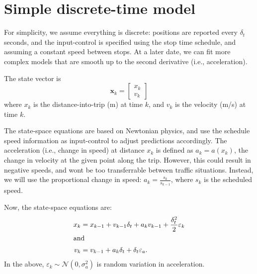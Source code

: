 \documentclass[11pt]{article}\usepackage[]{graphicx}\usepackage[]{color}
\begin{document}
\section{Simple discrete-time model}

For simplicity, we assume everything is discrete: positions are reported every $\delta_t$
seconds, and the input-control is specified using the stop time schedule, and assuming a
constant speed between stops. At a later date, we can fit more complex models that are
smooth up to the second derivative (i.e., acceleration).

The state vector is
\begin{equation}
  \label{eq:state-vector}
  \mathbf{x}_k =
  \begin{bmatrix}
    x_k \\ v_k
  \end{bmatrix}
\end{equation}
where $x_k$ is the distance-into-trip (m) at time $k$, and $v_k$ is the velocity (m/s) at
time $k$.

The state-space equations are based on Newtonian physics, and use the schedule speed
information as input-control to adjust predictions accordingly.
The acceleration (i.e., change in speed) at distance $x_k$ is defined as $a_k = a(x_k)$, the change in velocity
at the given point along the trip.
However, this could result in negative speeds, and wont be too transferrable between traffic situations.
Instead, we will use the proportional change in speed: $a_k = \frac{s_k}{s_{k-1}}$, where $s_k$ is the scheduled speed.


Now, the state-space equations are:
\begin{align}
  \label{eq:state_space_eqns}
  x_k &= x_{k-1} + v_{k-1} \delta_t + a_k v_{k-1} + \frac{\delta_t^2}{2} \varepsilon_k \\
  \intertext{and}
  v_k &= v_{k-1} + a_k\delta_t + \delta_t \varepsilon_a.
\end{align}
In the above, $\varepsilon_k \sim \mathcal{N}\left(0,\sigma_a^2\right)$ is random
variation in acceleration.
\end{document}
